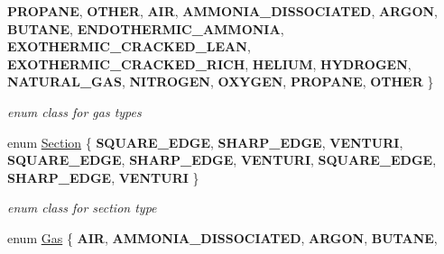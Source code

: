 \begin{DoxyCompactItemize}
{\bfseries P\+R\+O\+P\+A\+NE}, 
{\bfseries O\+T\+H\+ER}, 
\newline
{\bfseries A\+IR}, 
{\bfseries A\+M\+M\+O\+N\+I\+A\+\_\+\+D\+I\+S\+S\+O\+C\+I\+A\+T\+ED}, 
{\bfseries A\+R\+G\+ON}, 
{\bfseries B\+U\+T\+A\+NE}, 
\newline
{\bfseries E\+N\+D\+O\+T\+H\+E\+R\+M\+I\+C\+\_\+\+A\+M\+M\+O\+N\+IA}, 
{\bfseries E\+X\+O\+T\+H\+E\+R\+M\+I\+C\+\_\+\+C\+R\+A\+C\+K\+E\+D\+\_\+\+L\+E\+AN}, 
{\bfseries E\+X\+O\+T\+H\+E\+R\+M\+I\+C\+\_\+\+C\+R\+A\+C\+K\+E\+D\+\_\+\+R\+I\+CH}, 
{\bfseries H\+E\+L\+I\+UM}, 
\newline
{\bfseries H\+Y\+D\+R\+O\+G\+EN}, 
{\bfseries N\+A\+T\+U\+R\+A\+L\+\_\+\+G\+AS}, 
{\bfseries N\+I\+T\+R\+O\+G\+EN}, 
{\bfseries O\+X\+Y\+G\+EN}, 
\newline
{\bfseries P\+R\+O\+P\+A\+NE}, 
{\bfseries O\+T\+H\+ER}
 \}\begin{DoxyCompactList}\small\item\em enum class for gas types \end{DoxyCompactList}
\item 
\mbox{\label{class_flow_calculations_energy_use_afbabab0da698748de91369a5dfc7662a}} 
enum \hyperlink{class_flow_calculations_energy_use_afbabab0da698748de91369a5dfc7662a}{Section} \{ \newline
{\bfseries S\+Q\+U\+A\+R\+E\+\_\+\+E\+D\+GE}, 
{\bfseries S\+H\+A\+R\+P\+\_\+\+E\+D\+GE}, 
{\bfseries V\+E\+N\+T\+U\+RI}, 
{\bfseries S\+Q\+U\+A\+R\+E\+\_\+\+E\+D\+GE}, 
\newline
{\bfseries S\+H\+A\+R\+P\+\_\+\+E\+D\+GE}, 
{\bfseries V\+E\+N\+T\+U\+RI}, 
{\bfseries S\+Q\+U\+A\+R\+E\+\_\+\+E\+D\+GE}, 
{\bfseries S\+H\+A\+R\+P\+\_\+\+E\+D\+GE}, 
\newline
{\bfseries V\+E\+N\+T\+U\+RI}
 \}\begin{DoxyCompactList}\small\item\em enum class for section type \end{DoxyCompactList}
\item 
\mbox{\label{class_flow_calculations_energy_use_a840d5a836e7b05d6791b79bace4440f2}} 
enum \hyperlink{class_flow_calculations_energy_use_a840d5a836e7b05d6791b79bace4440f2}{Gas} \{ \newline
{\bfseries A\+IR}, 
{\bfseries A\+M\+M\+O\+N\+I\+A\+\_\+\+D\+I\+S\+S\+O\+C\+I\+A\+T\+ED}, 
{\bfseries A\+R\+G\+ON}, 
{\bfseries B\+U\+T\+A\+NE}, 

\end{DoxyCompactItemize}
